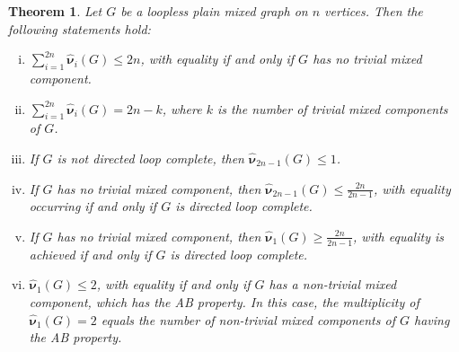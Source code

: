 \documentclass[12pt]{article}
\numberwithin{equation}{section}
\newtheorem{thm}{Theorem}[section]
\begin{document}
	\begin{thm}\label{Th4.3}
		Let $G$ be a loopless plain mixed graph on $n$ vertices. Then the following statements hold:
		\begin{enumerate}[(i)]
			\item $\sum_{i=1}^{2n}\hat{\bm{\nu}}_i(G)\leq2n$, with equality if and only if $G$ has no trivial mixed component.
			\item $\sum_{i=1}^{2n}\hat{\bm{\nu}}_i(G)=2n-k$, where $k$ is the number of trivial mixed components of $G$.
			\item If $G$ is not directed loop complete, then $\hat{\bm{\nu}}_{2n-1}(G)\leq 1$.
			\item If $G$ has no trivial mixed component, then $\hat{\bm{\nu}}_{2n-1}(G)\leq\frac{2n}{2n-1}$, with equality occurring if and only if $G$ is directed loop complete.
			
			\item If $G$ has no trivial mixed component, then $\hat{\bm{\nu}}_{1}(G)\geq\frac{2n}{2n-1}$, with equality is achieved if and only if $G$ is directed loop complete.
			\item $\hat{\bm{\nu}}_1(G)\leq 2$, with equality if and only if $G$ has a non-trivial mixed component, which has the AB property. 
			In this case, the multiplicity of $\hat{\bm{\nu}}_1(G)= 2$ equals the number of non-trivial mixed components of $G$ having the AB property.
		\end{enumerate}
	\end{thm}
\end{document}
